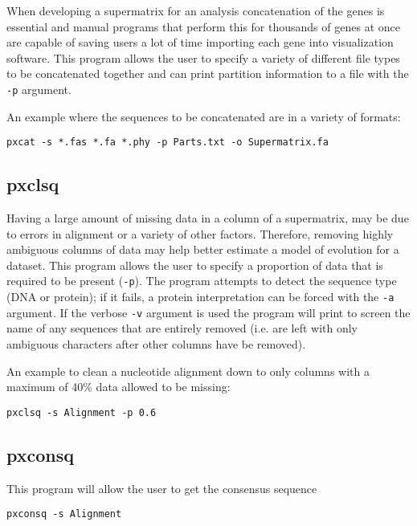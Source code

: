 \documentclass[12pt,letterpaper]{memoir}
\begin{document}
When developing a supermatrix for an analysis concatenation of the genes is essential and manual programs that perform this for thousands of genes at once are capable of saving users a lot of time importing each gene into visualization software. This program allows the user to specify a variety of different file types to be concatenated together and can print partition information to a file with the \texttt{-p} argument.

\begin{flushleft}
An example where the sequences to be concatenated are in a variety of formats:
\begin{verbatim}
pxcat -s *.fas *.fa *.phy -p Parts.txt -o Supermatrix.fa
\end{verbatim}
\end{flushleft}

\subsection{pxclsq}

Having a large amount of missing data in a column of a supermatrix, may be due to errors in alignment or a variety of other factors. Therefore, removing highly ambiguous columns of data may help better estimate a model of evolution for a dataset. This program allows the user to specify a proportion of data that is required to be present (\texttt{-p}). The program attempts to detect the sequence type (DNA or protein); if it fails,  a protein interpretation can be forced with the \texttt{-a} argument. If the verbose \texttt{-v} argument is used the program will print to screen the name of any sequences that are entirely removed (i.e. are left with only ambiguous characters after other columns have be removed).

\begin{flushleft}
An example to clean a nucleotide alignment down to only columns with a
maximum of 40\% data allowed to be missing:
\begin{verbatim}
pxclsq -s Alignment -p 0.6
\end{verbatim}
\end{flushleft}

\subsection{pxconsq}

This program will allow the user to get the consensus sequence 

\begin{flushleft}
\begin{verbatim}
pxconsq -s Alignment
\end{verbatim}
\end{flushleft}
\end{document}

